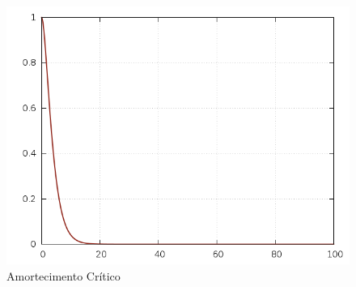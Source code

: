 \documentclass[a4paper,12pt]{article}
\begin{document}
\begin{itemize}
	\begin{figure}[h]
		\centering
		\includegraphics[scale=0.6]{7o2.png}
		\caption{Amortecimento Crítico}
	\end{figure}
	
	\end{itemize}
	
	
\end{document}
